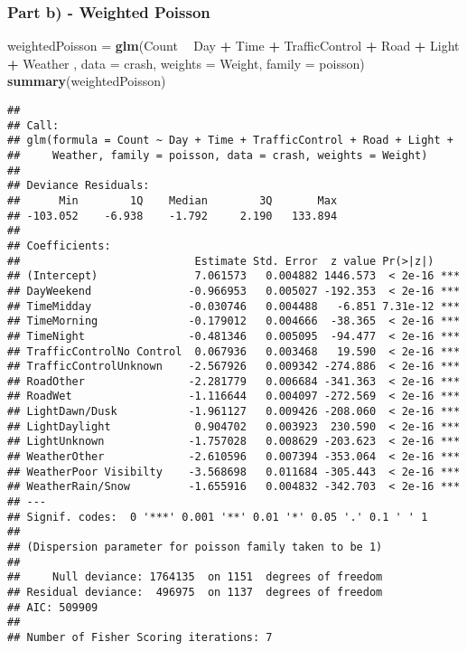 \documentclass[]{article}
\newenvironment{Shaded}{\begin{snugshade}}{\end{snugshade}}
\newcommand{\DataTypeTok}[1]{\textcolor[rgb]{0.13,0.29,0.53}{#1}}
\newcommand{\KeywordTok}[1]{\textcolor[rgb]{0.13,0.29,0.53}{\textbf{#1}}}
\newcommand{\NormalTok}[1]{#1}
\newcommand{\OperatorTok}[1]{\textcolor[rgb]{0.81,0.36,0.00}{\textbf{#1}}}
\newcommand{\StringTok}[1]{\textcolor[rgb]{0.31,0.60,0.02}{#1}}
\begin{document}
\hypertarget{part-b---weighted-poisson}{%
\subsubsection{Part b) - Weighted
Poisson}\label{part-b---weighted-poisson}}

\begin{Shaded}
\begin{Highlighting}[]
\NormalTok{weightedPoisson =}\StringTok{ }\KeywordTok{glm}\NormalTok{(Count }\OperatorTok{~}\StringTok{ }\NormalTok{Day }\OperatorTok{+}\StringTok{ }\NormalTok{Time }\OperatorTok{+}\StringTok{ }\NormalTok{TrafficControl }\OperatorTok{+}\StringTok{ }\NormalTok{Road }\OperatorTok{+}\StringTok{ }\NormalTok{Light }\OperatorTok{+}\StringTok{ }\NormalTok{Weather , }\DataTypeTok{data =}\NormalTok{ crash, }\DataTypeTok{weights =}\NormalTok{ Weight, }\DataTypeTok{family =}\NormalTok{ poisson)}
\KeywordTok{summary}\NormalTok{(weightedPoisson)}
\end{Highlighting}
\end{Shaded}

\begin{verbatim}
## 
## Call:
## glm(formula = Count ~ Day + Time + TrafficControl + Road + Light + 
##     Weather, family = poisson, data = crash, weights = Weight)
## 
## Deviance Residuals: 
##      Min        1Q    Median        3Q       Max  
## -103.052    -6.938    -1.792     2.190   133.894  
## 
## Coefficients:
##                           Estimate Std. Error  z value Pr(>|z|)    
## (Intercept)               7.061573   0.004882 1446.573  < 2e-16 ***
## DayWeekend               -0.966953   0.005027 -192.353  < 2e-16 ***
## TimeMidday               -0.030746   0.004488   -6.851 7.31e-12 ***
## TimeMorning              -0.179012   0.004666  -38.365  < 2e-16 ***
## TimeNight                -0.481346   0.005095  -94.477  < 2e-16 ***
## TrafficControlNo Control  0.067936   0.003468   19.590  < 2e-16 ***
## TrafficControlUnknown    -2.567926   0.009342 -274.886  < 2e-16 ***
## RoadOther                -2.281779   0.006684 -341.363  < 2e-16 ***
## RoadWet                  -1.116644   0.004097 -272.569  < 2e-16 ***
## LightDawn/Dusk           -1.961127   0.009426 -208.060  < 2e-16 ***
## LightDaylight             0.904702   0.003923  230.590  < 2e-16 ***
## LightUnknown             -1.757028   0.008629 -203.623  < 2e-16 ***
## WeatherOther             -2.610596   0.007394 -353.064  < 2e-16 ***
## WeatherPoor Visibilty    -3.568698   0.011684 -305.443  < 2e-16 ***
## WeatherRain/Snow         -1.655916   0.004832 -342.703  < 2e-16 ***
## ---
## Signif. codes:  0 '***' 0.001 '**' 0.01 '*' 0.05 '.' 0.1 ' ' 1
## 
## (Dispersion parameter for poisson family taken to be 1)
## 
##     Null deviance: 1764135  on 1151  degrees of freedom
## Residual deviance:  496975  on 1137  degrees of freedom
## AIC: 509909
## 
## Number of Fisher Scoring iterations: 7
\end{verbatim}
\end{document}
